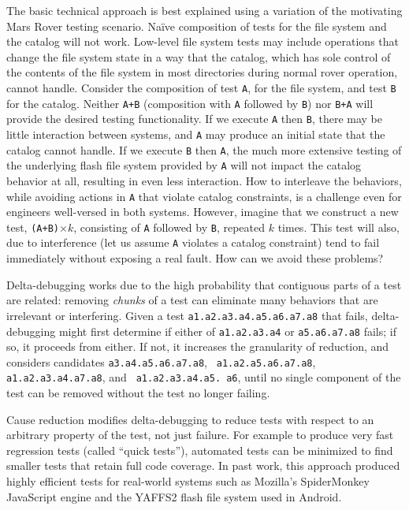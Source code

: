 The basic technical approach is best explained using a variation of the motivating
Mars Rover testing scenario.  Na\"ive composition of tests for the file
system and the catalog will not work.  Low-level file system tests may
include operations that change the file system state in a way that the
catalog, which has sole control of the contents of the file system in
most directories during normal rover operation, cannot handle.
Consider the composition of test {\tt A}, for the file system, and
test {\tt B} for the catalog.  Neither {\tt A+B} (composition with
{\tt A} followed by {\tt B}) nor {\tt B+A} will provide the desired
testing functionality.  If we execute {\tt A} then {\tt B}, there may be little
interaction between systems, and {\tt A} may produce an initial state
that the catalog cannot handle.  If we execute {\tt B} then {\tt A},
the much more extensive testing of the underlying flash file system
provided by {\tt A} will not impact the catalog behavior at all, resulting
in even less interaction.  How to interleave the behaviors, while
avoiding actions in {\tt A} that violate catalog constraints, is a challenge
even for engineers well-versed in both systems.  However, imagine that
we construct a new test, {\tt (A+B)}$\times k$, consisting of {\tt A}
followed by {\tt B}, repeated $k$ times.  This test will also, due to
interference (let us assume {\tt A} violates a catalog constraint) tend to
fail immediately without exposing a real fault. How can we avoid these problems?


Delta-debugging works due to the high probability that contiguous parts
of a test are related: removing \emph{chunks} of a test can
eliminate many behaviors that are irrelevant or interfering.  Given
a test {\tt a1.a2.a3.a4.a5.a6.a7.a8} that fails, delta-debugging 
might first determine if
either of {\tt a1.a2.a3.a4} or {\tt a5.a6.a7.a8} fails; if so, it
proceeds from either.  If not, it increases the granularity of
reduction, and considers candidates {\tt a3.a4.a5.a6.a7.a8}, {\tt
  a1.a2.a5.a6.a7.a8}, {\tt a1.a2.a3.a4.a7.a8}, and {\tt
  a1.a2.a3.a4.a5. a6}, until no single component of the test can be
removed without the test no longer failing.

Cause reduction \cite{icst2014,stvrcausereduce} modifies
delta-debugging to reduce tests with respect to an arbitrary property
of the test, not just failure.  For example to produce very fast
regression tests (called “quick tests”), automated tests can be
minimized to find smaller tests that retain full code coverage.  In
past work, this approach produced highly efficient tests for
real-world systems such as Mozilla's SpiderMonkey JavaScript engine
and the YAFFS2 flash file system used in Android.

